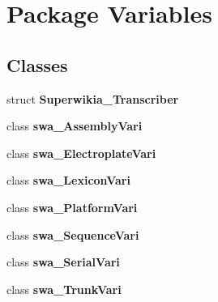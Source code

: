 \hypertarget{namespace_variables}{\section{Package Variables}
\label{namespace_variables}
}
\subsection*{Classes}
\begin{DoxyCompactItemize}
\item 
struct {\bfseries Superwikia\+\_\+\+Transcriber}
\item 
class {\bfseries swa\+\_\+\+Assembly\+Vari}
\item 
class {\bfseries swa\+\_\+\+Electroplate\+Vari}
\item 
class {\bfseries swa\+\_\+\+Lexicon\+Vari}
\item 
class {\bfseries swa\+\_\+\+Platform\+Vari}
\item 
class {\bfseries swa\+\_\+\+Sequence\+Vari}
\item 
class {\bfseries swa\+\_\+\+Serial\+Vari}
\item 
class {\bfseries swa\+\_\+\+Trunk\+Vari}
\end{DoxyCompactItemize}
